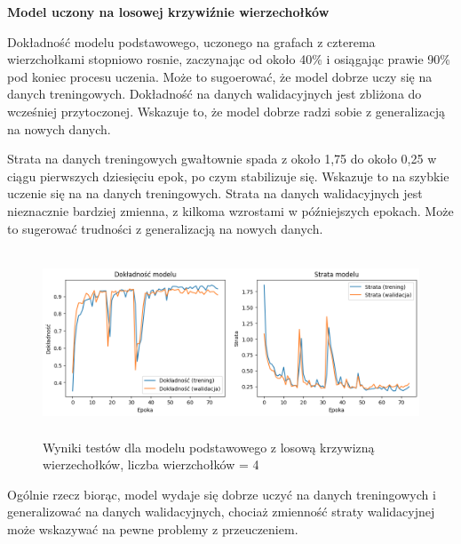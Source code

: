 
\textbf{Model uczony na losowej krzywiźnie wierzechołków}

Dokładność modelu podstawowego, uczonego na grafach z czterema wierzchołkami stopniowo rosnie,
zaczynając od około 40\% i osiągając prawie 90\% pod koniec procesu uczenia.
Może to sugoerować, że model dobrze uczy się na danych treningowych.
Dokładność na danych walidacyjnych jest zbliżona do wcześniej przytoczonej.
Wskazuje to, że model dobrze radzi sobie z generalizacją na nowych danych.

Strata na danych treningowych gwałtownie spada z około 1,75 do około 0,25 w ciągu pierwszych dziesięciu epok,
po czym stabilizuje się.
Wskazuje to na szybkie uczenie się na na danych treningowych.
Strata na danych walidacyjnych jest nieznacznie bardziej zmienna,
z kilkoma wzrostami w późniejszych epokach.
Może to sugerować trudności z generalizacją na nowych danych.

\begin{figure}[ht]
	\centering
	\includegraphics[height=5.5cm]{resources/tests/images/v3/base4_img.png}
	\caption{Wyniki testów dla modelu podstawowego z losową krzywizną wierzechołków, liczba wierzchołków = 4}
	\label{Fig:tests-base-1}
\end{figure}
\FloatBarrier

Ogólnie rzecz biorąc, model wydaje się dobrze uczyć na danych treningowych i generalizować na danych walidacyjnych,
chociaż zmienność straty walidacyjnej może wskazywać na pewne problemy z przeuczeniem.

